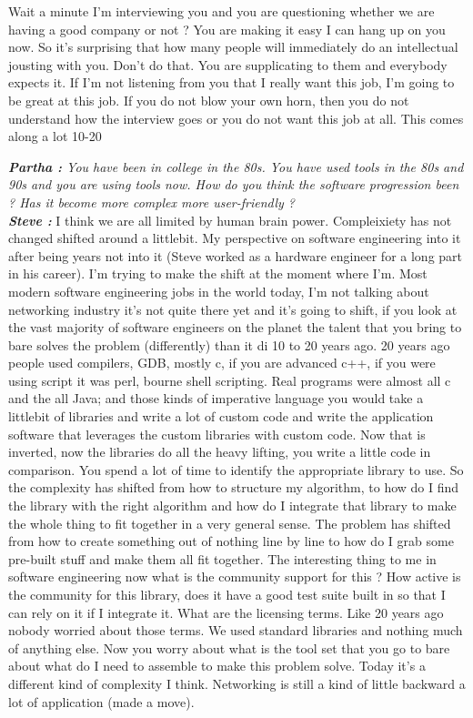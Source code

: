\documentclass[a4paper, 12pt]{article}
\begin{document}
\begin{flushleft}
Wait a minute I'm interviewing you and you are questioning whether we are having a good company or not ?  You are making it easy I can hang up on you now.  So it’s surprising that how many people will immediately do an intellectual jousting with you. Don’t do that. You are supplicating to them and everybody expects it. If I'm not listening from you that I really want this job, I'm going to be great at this job. If you do not blow your own horn, then you do not understand how the interview goes or you do not want this job at all. This comes along a lot 10-20%

        \textit {\textbf {Partha :} You have been in college in the 80s. You have used tools in the 80s and 90s and you are using tools now. How do you think the software progression been ? Has it become more complex more user-friendly ?  \\}
        \textit {\textbf {Steve :}} I think we are all limited by human brain power. Compleixiety has not changed shifted around a littlebit. My perspective on software engineering into it after being years not into it (Steve worked as a hardware engineer for a long part in his career). I'm trying to make the shift at the moment where I'm.  Most modern software engineering jobs in the world today, I'm not talking about networking industry it’s not quite there yet and it's going to shift, if you look at the vast majority of software engineers on the planet the talent that you bring to bare solves the problem (differently) than it di 10 to 20 years ago. 20 years ago people used compilers, GDB, mostly c, if you are advanced c++, if you were using script it was perl, bourne shell scripting. Real programs were almost all c and the all Java; and those kinds of imperative language you would take a littlebit of libraries and write a lot of custom code  and write the application software that leverages the custom libraries with custom code. Now that is inverted, now the  libraries do all the heavy lifting, you write a little code in comparison. You spend a lot of time to identify the  appropriate library to use. So the complexity has shifted from how to structure my algorithm, to how do I find the library with the right algorithm  and how do I integrate that library to make the whole thing to fit together in a very general sense. The problem has shifted from how to create something out of nothing line by line to how do I grab some pre-built stuff and make them all fit together. The interesting thing to me in software engineering now what is the community support for this ? How active is the community for this library, does it have a good test suite built in so that I can rely on it if I integrate it. What are the licensing terms. Like 20 years ago nobody worried about those terms. We used standard libraries and nothing much of anything else.  Now you worry about what is the tool set that you go to bare about what do I need to assemble to make this problem solve. Today it's a different kind of complexity I think. Networking is still a kind of little backward a lot of application (made a move). \\~\\


\end{flushleft}
\end{document}
